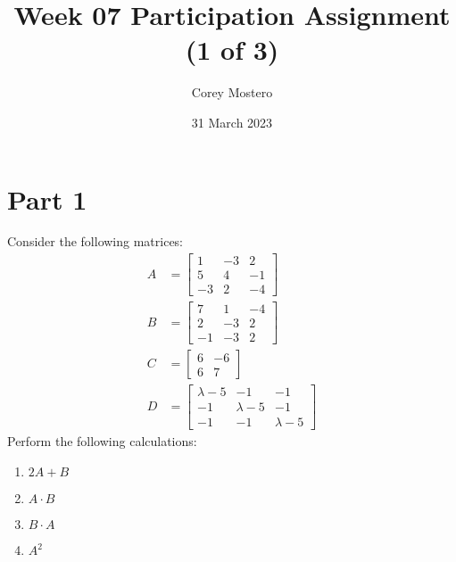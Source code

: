 \documentclass{article}
\title{Week 07 Participation Assignment (1 of 3)}
\author{Corey Mostero}
\date{31 March 2023}
\begin{document}
\newcommand{\hr}{\par\noindent\rule{\textwidth}{0.4pt}}

\newcommand{\bc}[1]{
	\begin{equation*}
		\begin{boxed}
			{#1}
		\end{boxed}
	\end{equation*}
}

\newcommand{\cond}[2]{
	\ifmmode
		{#1} \quad {#2}
	\else
		$$ {#1} \quad {#2} $$
	\fi
}

\maketitle
\newpage

\tableofcontents

\section{Part 1}
Consider the following matrices:
\begin{align*}
	A & = \begin{bmatrix}
		1 & -3 & 2 \\
		5 & 4 & -1 \\
		-3 & 2 & -4
	\end{bmatrix} \\
	B & = \begin{bmatrix}
		7 & 1 & -4 \\
		2 & -3 & 2 \\
		-1 & -3 & 2
	\end{bmatrix} \\
	C & = \begin{bmatrix}
		6 & -6 \\
		6 & 7
	\end{bmatrix} \\
	D & = \begin{bmatrix}
		\lambda - 5 & -1 & -1 \\
		-1 & \lambda - 5 & -1 \\
		-1 & -1 & \lambda - 5
	\end{bmatrix}
\end{align*}
Perform the following calculations:
\begin{enumerate}[label=\textbf{\arabic*).}]
	\item $ 2A + B $
	\item $ A \cdot B $
	\item $ B \cdot A $
	\item $ A^2 $
\end{enumerate}
\end{document}

